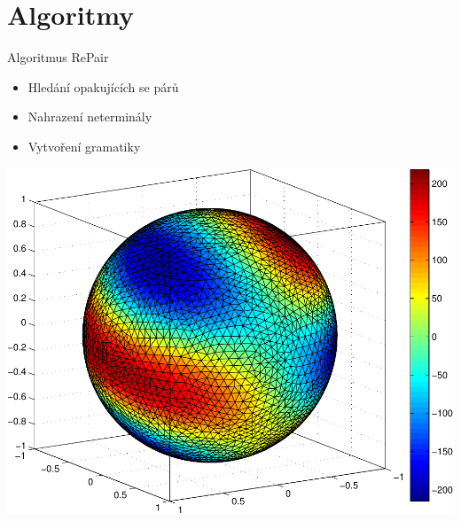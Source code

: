 \documentclass[lualatex,hyperref={pdfencoding=auto}]{beamer}
\begin{document}
\section{Algoritmy}
\begin{frame}{Algoritmus RePair}
\begin{itemize}
  \item Hledání opakujících se párů
  \item Nahrazení neterminály
  \item Vytvoření gramatiky
\end{itemize}
\includegraphics[width=\textwidth]{fig/sphere_mix_real.pdf}
\end{frame}
\end{document}
